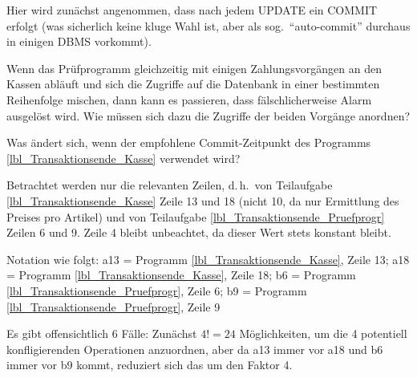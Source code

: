 \begin{enumerate}[a)]
    Hier wird zunächst angenommen, dass nach jedem UPDATE ein COMMIT erfolgt (was sicherlich keine kluge Wahl ist, aber als sog.\ "`auto-commit"' durchaus in einigen DBMS vorkommt).

		Wenn das Prüfprogramm gleichzeitig mit einigen Zahlungsvorgängen an den Kassen abläuft und sich die Zugriffe auf die Datenbank in einer bestimmten Reihenfolge mischen, dann kann es passieren, dass fälschlicherweise Alarm ausgelöst wird. Wie müssen sich dazu die Zugriffe der beiden Vorgänge anordnen?

    Was ändert sich, wenn der empfohlene Commit-Zeitpunkt des Programms \ref{lbl_Transaktionsende_Kasse} verwendet wird?

		\begin{solution}
		Betrachtet werden nur die relevanten Zeilen, d.\,h.\ von Teilaufgabe \ref{lbl_Transaktionsende_Kasse} Zeile 13 und 18 (nicht 10, da nur Ermittlung des Preises pro Artikel) und von Teilaufgabe \ref{lbl_Transaktionsende_Pruefprogr} Zeilen 6 und 9. Zeile 4 bleibt unbeachtet, da dieser Wert stets konstant bleibt.

		Notation wie folgt:
		a13 = Programm \ref{lbl_Transaktionsende_Kasse}, Zeile 13; a18 = Programm \ref{lbl_Transaktionsende_Kasse}, Zeile 18; b6 = Programm \ref{lbl_Transaktionsende_Pruefprogr}, Zeile 6; b9 = Programm \ref{lbl_Transaktionsende_Pruefprogr}, Zeile 9

		Es gibt offensichtlich 6 Fälle: Zunächst $4!=24$ Möglichkeiten, um die 4 potentiell konfligierenden Operationen anzuordnen, aber da a13 immer vor a18 und b6 immer vor b9 kommt, reduziert sich das um den Faktor 4.
\newcommand{\preWare}{\item b6: Lese Warenwert aller Artikel (\emph{vor} Warenänderung aus akt. Einkauf).}
\newcommand{\postWare}{\item b6: Lese Warenwert aller Artikel (\emph{nach} Warenänderung aus akt. Einkauf).}
\newcommand{\preMoney}{\item b9: Lese Geldinhalt aller Kassen (\emph{vor} Geldänderung aus akt. Einkauf).}
\newcommand{\postMoney}{\item b9: Lese Geldinhalt aller Kassen (\emph{nach} Geldänderung aus akt. Einkauf).}
\newcommand{\ware}{\item a13: Reduziere Warenanzahl.}
\newcommand{\money}{\item a18: Erhöhe Geldinhalt der Kasse.}
\newcommand{\postSuccess}{\item[->] Prüfung erfolgreich. Der aktuelle Einkauf wurde berücksichtigt}
\newcommand{\preSuccess}{\item[->] Prüfung erfolgreich, da aktueller Einkauf \emph{nicht} berücksichtigt wurde.}


\end{solution}
\end{enumerate}
